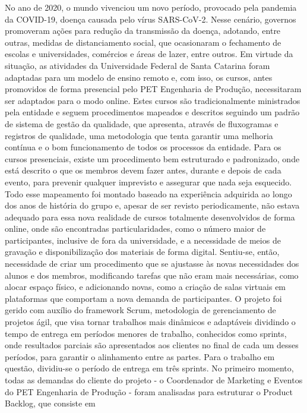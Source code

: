 No ano de 2020, o mundo vivenciou um novo período, provocado pela pandemia da COVID-19, 
doença causada pelo vírus SARS-CoV-2. Nesse cenário, governos promoveram ações para 
redução da transmissão da doença, adotando, entre outras, medidas de distanciamento social, que 
ocasionaram o fechamento de escolas e universidades, comércios e áreas de lazer, entre outros. 
Em virtude da situação, as atividades da Universidade Federal de Santa Catarina foram adaptadas 
para um modelo de ensino remoto e, com isso, os cursos, antes promovidos de forma presencial 
pelo PET Engenharia de Produção, necessitaram ser adaptados para o modo online.
Estes cursos são tradicionalmente ministrados pela entidade e seguem procedimentos mapeados e 
descritos seguindo um padrão de sistema de gestão da qualidade, que apresenta, através de 
fluxogramas e registros de qualidade, uma metodologia que tenta garantir uma melhoria contínua 
e o bom funcionamento de todos os processos da entidade. Para os cursos presenciais, existe um 
procedimento bem estruturado e padronizado, onde está descrito o que os membros devem fazer 
antes, durante e depois de cada evento, para prevenir qualquer imprevisto e assegurar que nada 
seja esquecido. Todo esse mapeamento foi montado baseado na experiência adquirida ao longo 
dos anos de história do grupo e, apesar de ser revisto periodicamente, não estava adequado para 
essa nova realidade de cursos totalmente desenvolvidos de forma online, onde são encontradas 
particularidades, como o número maior de participantes, inclusive de fora da universidade, e a 
necessidade de meios de gravação e disponibilização dos materiais de forma digital. Sentiu-se, 
então, necessidade de criar um procedimento que se ajustasse às novas necessidades dos alunos e 
dos membros, modificando tarefas que não eram mais necessárias, como alocar espaço físico, e 
adicionando novas, como a criação de salas virtuais em plataformas que comportam a nova 
demanda de participantes.
O projeto foi gerido com auxílio do framework Scrum, metodologia de gerenciamento de projetos 
ágil, que visa tornar trabalhos mais dinâmicos e adaptáveis dividindo o tempo de entrega em 
períodos menores de trabalho, conhecidos como sprints, onde resultados parciais são apresentados 
aos clientes no final de cada um desses períodos, para garantir o alinhamento entre as partes. Para 
o trabalho em questão, dividiu-se o período de entrega em três sprints. No primeiro momento, 
todas as demandas do cliente do projeto - o Coordenador de Marketing e Eventos do PET 
Engenharia de Produção - foram analisadas para estruturar o Product Backlog, que consiste em 
